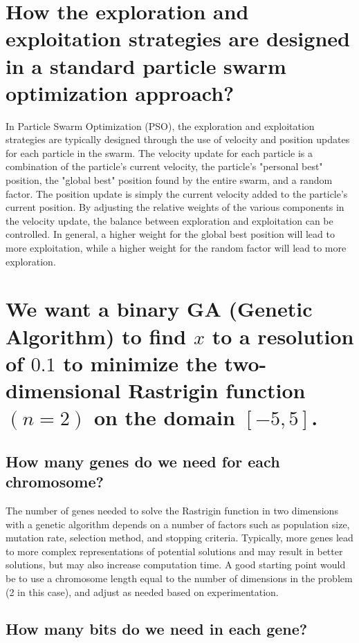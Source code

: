 \documentclass[conference]{IEEEtran}
\begin{document}
\section{How the exploration and exploitation strategies are designed in a standard particle swarm optimization approach?}

In Particle Swarm Optimization (PSO), the exploration and exploitation strategies are typically designed through the use of velocity and position updates for each particle in the swarm. The velocity update for each particle is a combination of the particle's current velocity, the particle's "personal best" position, the "global best" position found by the entire swarm, and a random factor. The position update is simply the current velocity added to the particle's current position. By adjusting the relative weights of the various components in the velocity update, the balance between exploration and exploitation can be controlled. In general, a higher weight for the global best position will lead to more exploitation, while a higher weight for the random factor will lead to more exploration.

\section{We want a binary GA (Genetic Algorithm) to find $x$ to a resolution of $0.1$ to minimize the two-dimensional Rastrigin function $(n=2)$ on the domain $[-5,5]$.}

\subsection{How many genes do we need for each chromosome?}

The number of genes needed to solve the Rastrigin function in two dimensions with a genetic algorithm depends on a number of factors such as population size, mutation rate, selection method, and stopping criteria. Typically, more genes lead to more complex representations of potential solutions and may result in better solutions, but may also increase computation time. A good starting point would be to use a chromosome length equal to the number of dimensions in the problem (2 in this case), and adjust as needed based on experimentation.

\subsection{How many bits do we need in each gene?}
\end{document}

